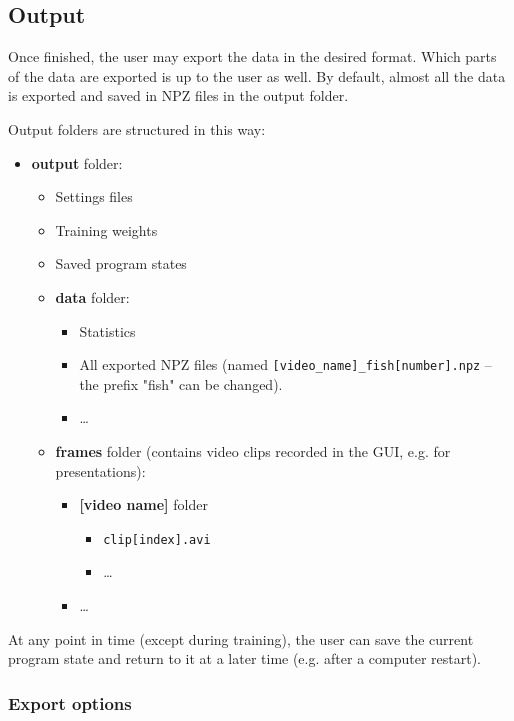 \documentclass[9pt,lineno]{elife}
\begin{document}
\begin{appendixbox}
\subsection{Output}

Once finished, the user may export the data in the desired format. Which parts of the data are exported is up to the user as well. By default, almost all the data is exported and saved in NPZ files in the output folder.

Output folders are structured in this way:

\begin{itemize}
\item \textbf{output} folder:
    \begin{itemize}
        \item Settings files
        \item Training weights
        \item Saved program states
        \item \textbf{data} folder:
        \begin{itemize}
            \item Statistics
            \item All exported NPZ files (named \texttt{[video\_name]\_fish[number].npz} -- the prefix "fish" can be changed).
            \item \dots
        \end{itemize}
        \item \textbf{frames} folder (contains video clips recorded in the GUI, e.g. for presentations):
        \begin{itemize}
            \item \textbf{[video name]} folder
            \begin{itemize}
                \item \texttt{clip[index].avi}
                \item \dots
            \end{itemize}
            \item \dots
        \end{itemize}
    \end{itemize}
\end{itemize}

At any point in time (except during training), the user can save the current program state and return to it at a later time (e.g. after a computer restart).

\subsubsection{Export options}


\end{appendixbox}
\end{document}
